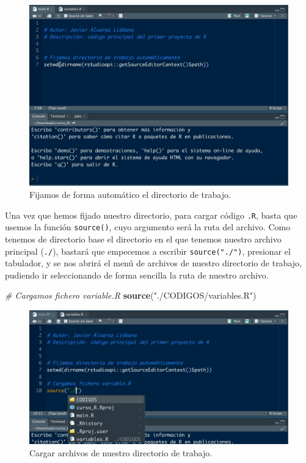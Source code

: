\documentclass[11pt,]{book}
\newenvironment{Shaded}{\begin{snugshade}}{\end{snugshade}}
\newcommand{\CommentTok}[1]{\textcolor[rgb]{0.37,0.37,0.37}{\textit{#1}}}
\newcommand{\KeywordTok}[1]{\textcolor[rgb]{0.27,0.27,0.27}{\textbf{#1}}}
\newcommand{\NormalTok}[1]{#1}
\newcommand{\StringTok}[1]{\textcolor[rgb]{0.5,0.5,0.5}{#1}}
\begin{document}
\begin{figure}

{\centering \includegraphics[width=0.5\linewidth]{./img/setwd} 

}

\caption{Fijamos de forma automático el directorio de trabajo.}\label{fig:setwd}
\end{figure}

Una vez que hemos fijado nuestro directorio, para cargar código \texttt{.R}, basta que usemos la función \texttt{source()}, cuyo argumento será la ruta del archivo. Como tenemos de directorio base el directorio en el que tenemos nuestro archivo principal (\texttt{./}), bastará que empecemos a escribir \texttt{source("./")}, presionar el tabulador, y se nos abrirá el menú de archivos de nuestro directorio de trabajo, pudiendo ir seleccionando de forma sencilla la ruta de nuestro archivo.

\begin{Shaded}
\begin{Highlighting}[]
\CommentTok{# Cargamos fichero variable.R}
\KeywordTok{source}\NormalTok{(}\StringTok{"./CODIGOS/variables.R"}\NormalTok{)}
\end{Highlighting}
\end{Shaded}

\begin{figure}

{\centering \includegraphics[width=0.5\linewidth]{./img/menu_carpetas} 

}

\caption{Cargar archivos de nuestro directorio de trabajo.}\label{fig:menu-carpetas}
\end{figure}
\end{document}

